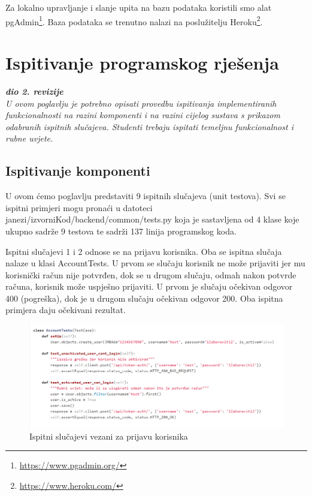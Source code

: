 			Za lokalno upravljanje i slanje upita na bazu podataka koristili smo alat pgAdmin\footnote{\url{https://www.pgadmin.org/}}. Baza podataka se trenutno nalazi na poslužitelju Heroku\footnote{\url{https://www.heroku.com/}}.
			
			
			
			
			\eject 
		
	
		\section{Ispitivanje programskog rješenja}
			
			\textbf{\textit{dio 2. revizije}}\\
			
			 \textit{U ovom poglavlju je potrebno opisati provedbu ispitivanja implementiranih funkcionalnosti na razini komponenti i na razini cijelog sustava s prikazom odabranih ispitnih slučajeva. Studenti trebaju ispitati temeljnu funkcionalnost i rubne uvjete.}
	
			
			\subsection{Ispitivanje komponenti}
			U ovom ćemo poglavlju predstaviti 9 ispitnih slučajeva (unit testova). Svi se ispitni primjeri mogu pronaći u datoteci janezi/izvorniKod/backend/common/tests.py koja je sastavljena od 4 klase koje ukupno sadrže 9 testova te sadrži 137 linija programskog koda.
			
			\vspace{5mm} %
			
			Ispitni slučajevi 1 i 2 odnose se na prijavu korisnika. Oba se ispitna slučaja nalaze u klasi AccountTests. U prvom se slučaju korisnik ne može prijaviti jer mu korisnički račun nije potvrđen, dok se u drugom slučaju, odmah nakon potvrde računa, korisnik može uspješno prijaviti. U prvom je slučaju očekivan odgovor 400 (pogreška), dok je u drugom slučaju očekivan odgovor 200. Oba ispitna primjera daju očekivani rezultat.
			
			\begin{figure}[H]
				\centering
				\includegraphics[scale=0.65]{slike/AccountTests.PNG}
				\caption{Ispitni slučajevi vezani za prijavu korisnika}
				\label{fig:promjene}
			\end{figure}
		
